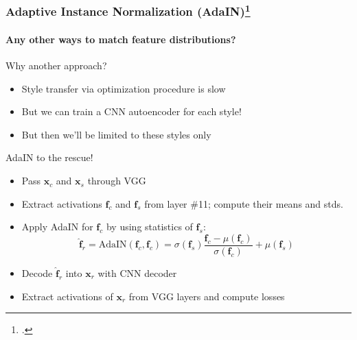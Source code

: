 \documentclass[10pt]{beamer}
\begin{document}
\begin{frame}
\frametitle{Adaptive Instance Normalization (AdaIN)\footcite{AdaIN_Style_Transfer}}
\framesubtitle{Any other ways to match feature distributions?}

Why another approach?
\begin{itemize}
    \item Style transfer via optimization procedure is slow
    \item But we can train a CNN autoencoder for each style!
    \item But then we'll be limited to these styles only
\end{itemize}

AdaIN to the rescue!
\begin{itemize}
    \item Pass $\bm x_c$ and $\bm x_s$ through VGG
    \item Extract activations $\bm f_c$ and $\bm f_s$ from layer \#11; compute their means and stds.
    \item Apply AdaIN for $\bm f_c$ by using statistics of $\bm f_s$:
\[
\hat{\bm f}_r = \text{AdaIN}(\bm f_c, \bm f_c) = \sigma(\bm f_s) \frac{\bm f_c - \mu(\bm f_c)}{\sigma(\bm f_c)} + \mu(\bm f_s)
\]
    \item Decode $\hat{\bm f}_r$ into $\bm x_r$ with CNN decoder
    \item Extract activations of $\bm x_r$ from VGG layers and compute losses
\end{itemize}

\end{frame}
\end{document}
